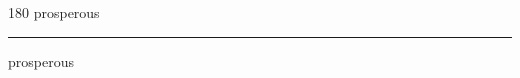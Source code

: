 
\begin{frame}
\begin{center}
\begin{turn}{180}
{\fontsize{2.5cm}{1em}\selectfont prosperous}
\end{turn}
\vspace{1em}\par  
\hrule
\vspace{1em}\par  
{\fontsize{2.5cm}{1em}\selectfont prosperous}
\end{center}
\end{frame}

